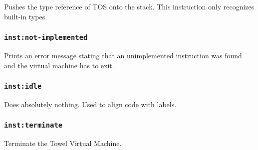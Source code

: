 \documentclass{article}
\newcommand{\inst}[1] {\texttt{inst:#1}}
\begin{document}
Pushes the type reference of TOS onto the stack. This instruction only recognizes built-in types.

\subsubsection{\inst{not-implemented}}

Prints an error message stating that an unimplemented instruction was found and the virtual machine has to exit.

\subsubsection{\inst{idle}}

Does absolutely nothing. Used to align code with labels.

\subsubsection{\inst{terminate}}

Terminate the Towel Virtual Machine.
\end{document}
